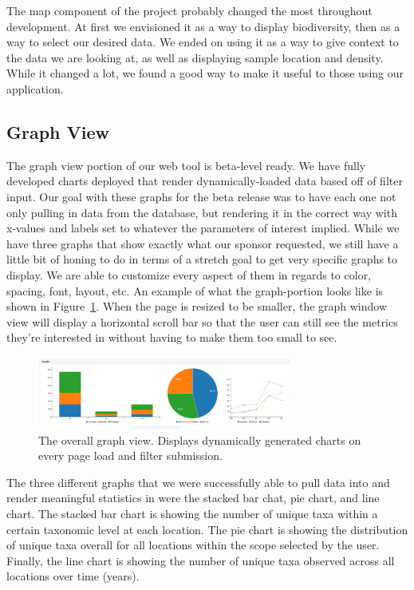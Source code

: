 \documentclass[10pt,draftclsnofoot,onecolumn]{IEEEtran}
\begin{document}
The map component of the project probably changed the most throughout development.
At first we envisioned it as a way to display biodiversity, then as a way to select our desired data.
We ended on using it as a way to give context to the data we are looking at, as well as displaying sample location and density.
While it changed a lot, we found a good way to make it useful to those using our application.

\subsection{Graph View} %
The graph view portion of our web tool is beta-level ready.
We have fully developed charts deployed that render dynamically-loaded data based off of filter input.
Our goal with these graphs for the beta release was to have each one not only pulling in data from the database, but rendering it in the correct way with x-values and labels set to whatever the parameters of interest implied.
While we have three graphs that show exactly what our sponsor requested, we still have a little bit of honing to do in terms of a stretch goal to get very specific graphs to display.
We are able to customize every aspect of them in regards to color, spacing, font, layout, etc.
An example of what the graph-portion looks like is shown in Figure~\ref{fig:graph_view}.
When the page is resized to be smaller, the graph window view will display a horizontal scroll bar so that the user can still see the metrics they’re interested in without having to make them too small to see.

\begin{figure}[h]
\centering
\includegraphics[width=0.75\textwidth]{images/graph_view.jpg}
\captionsetup{justification=centering}
\caption{
  The overall graph view.
  Displays dynamically generated charts on every page load and filter submission.
}
\label{fig:graph_view}
\end{figure}

The three different graphs that we were successfully able to pull data into and render meaningful statistics in were the stacked bar chat, pie chart, and line chart.
The stacked bar chart is showing the number of unique taxa within a certain taxonomic level at each location.
The pie chart is showing the distribution of unique taxa overall for all locations within the scope selected by the user.
Finally, the line chart is showing the number of unique taxa observed across all locations over time (years).
\end{document}
